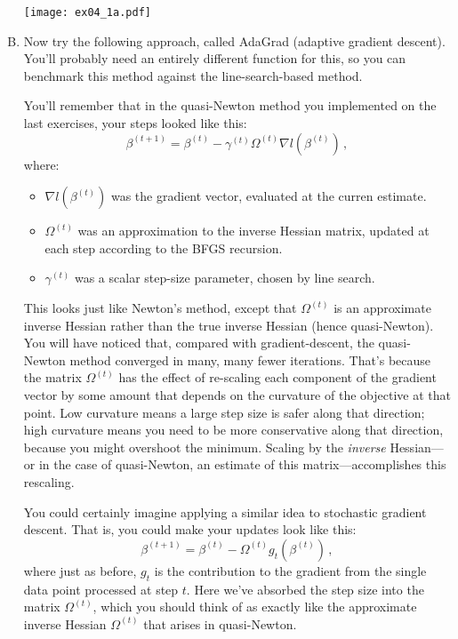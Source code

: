 \documentclass{article}
\begin{document}
\begin{enumerate}[(A)]
\begin{center}
\texttt{[image: ex04\_1a.pdf]}
\end{center}
\color{black}

\item Now try the following approach, called AdaGrad (adaptive gradient descent).  You'll probably need an entirely different function for this, so you can benchmark this method against the line-search-based method.

You'll remember that in the quasi-Newton method you implemented on the last exercises, your steps looked like this:
$$
\beta^{(t+1)} = \beta^{(t)} - \gamma^{(t)} \Omega^{(t)} \nabla l(\beta^{(t)}) \, ,
$$
where:
\begin{itemize}
\item $\nabla l(\beta^{(t)})$ was the gradient vector, evaluated at the curren estimate.
\item $\Omega^{(t)}$ was an approximation to the inverse Hessian matrix, updated at each step according to the BFGS recursion.
\item $\gamma^{(t)}$ was a scalar step-size parameter, chosen by line search.
\end{itemize}
This looks just like Newton's method, except that $\Omega^{(t)}$ is an approximate inverse Hessian rather than the true inverse Hessian (hence quasi-Newton).  You will have noticed that, compared with gradient-descent, the quasi-Newton method converged in many, many fewer iterations.  That's because the matrix $\Omega^{(t)}$ has the effect of re-scaling each component of the gradient vector by some amount that depends on the curvature of the objective at that point.  Low curvature means a large step size is safer along that direction; high curvature means you need to be more conservative along that direction, because you might overshoot the minimum.  Scaling by the \emph{inverse} Hessian---or in the case of quasi-Newton, an estimate of this matrix---accomplishes this rescaling.

You could certainly imagine applying a similar idea to stochastic gradient descent.  That is, you could make your updates look like this:
\begin{equation}
\label{eqn:online_quasi_newton}
\beta^{(t+1)} = \beta^{(t)} - \Omega^{(t)} g_t(\beta^{(t)}) \, ,
\end{equation}
where just as before, $g_t$ is the contribution to the gradient from the single data point processed at step $t$.  Here we've absorbed the step size into the matrix $\Omega^{(t)}$, which you should think of as exactly like the approximate inverse Hessian $\Omega^{(t)}$ that arises in quasi-Newton.


\end{enumerate}
\end{document}
